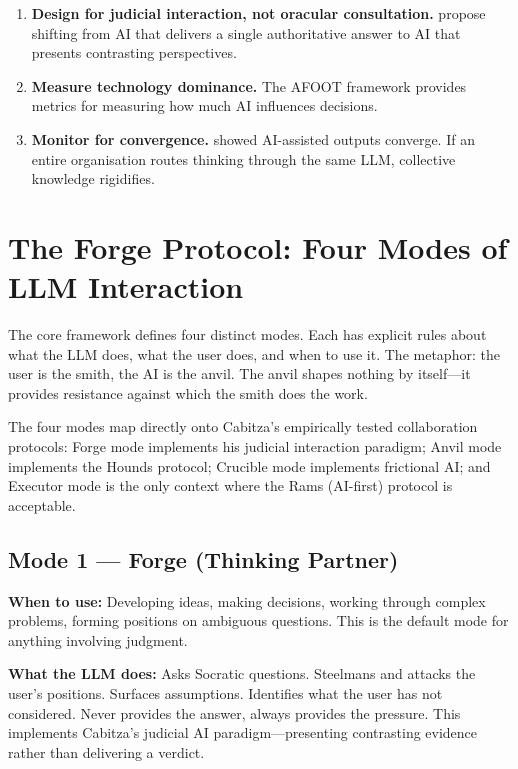 \documentclass[11pt,a4paper]{article}
\begin{document}
\begin{enumerate}
    \item \textbf{Design for judicial interaction, not oracular consultation.}
    \citet{cabitza2025judicial} propose shifting from AI that delivers a single
    authoritative answer to AI that presents contrasting perspectives.

    \item \textbf{Measure technology dominance.} The AFOOT framework
    \citep{cabitza2023dominion} provides metrics for measuring how much AI
    influences decisions.

    \item \textbf{Monitor for convergence.} \citet{doshi2024creativity} showed
    AI-assisted outputs converge. If an entire organisation routes thinking
    through the same LLM, collective knowledge rigidifies.
\end{enumerate}

\section{The Forge Protocol: Four Modes of LLM Interaction}
\label{sec:modes}

The core framework defines four distinct modes. Each has explicit rules about what
the LLM does, what the user does, and when to use it. The metaphor: the user is
the smith, the AI is the anvil. The anvil shapes nothing by itself---it provides
resistance against which the smith does the work.

The four modes map directly onto Cabitza's empirically tested collaboration
protocols: Forge mode implements his judicial interaction paradigm; Anvil mode
implements the Hounds protocol; Crucible mode implements frictional AI; and
Executor mode is the only context where the Rams (AI-first) protocol is
acceptable.

\subsection{Mode 1 --- Forge (Thinking Partner)}

\textbf{When to use:} Developing ideas, making decisions, working through complex
problems, forming positions on ambiguous questions. This is the default mode for
anything involving judgment.

\textbf{What the LLM does:} Asks Socratic questions. Steelmans and attacks the
user's positions. Surfaces assumptions. Identifies what the user has not
considered. Never provides the answer, always provides the pressure. This
implements Cabitza's judicial AI paradigm---presenting contrasting evidence rather
than delivering a verdict.
\end{document}
